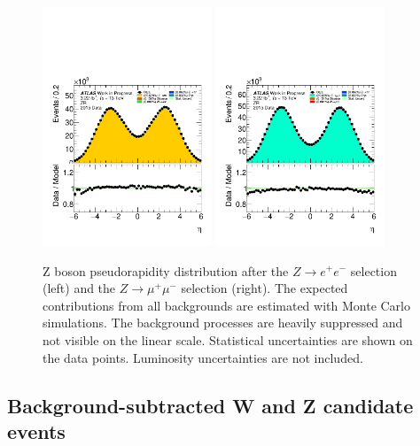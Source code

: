 \begin{figure}[htbp]
\centering
\includegraphics[width=0.45\textwidth]{figures/ZR/dataMc-dilep_eta-ZR-el.pdf}
\includegraphics[width=0.45\textwidth]{figures/ZR/dataMc-dilep_eta-ZR-mu.pdf}
\caption{
Z boson pseudorapidity distribution after the $Z \rightarrow e^+e^-$ selection (left) and the $Z \rightarrow \mu^+\mu^-$  selection (right).
The expected contributions from all backgrounds are estimated with Monte Carlo simulations.
The background processes are heavily suppressed and not visible on the linear scale. 
Statistical uncertainties are shown on the data points.
Luminosity uncertainties are not included.
}
\label{fig:ZR_dilep_eta}
\end{figure}

\subsection{Background-subtracted W and Z candidate events}
\label{sec:Background_subtracted_candidate_events}

